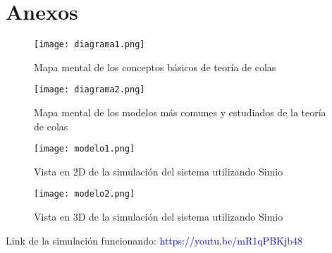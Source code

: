 \documentclass{article}
\begin{document}
\section{Anexos}
\begin{figure}[h]
\begin{center}
	\texttt{[image: diagrama1.png]}
		 \caption{Mapa mental de los conceptos básicos de teoría de colas}
\label{fig5:mapa}
\end{center}
\end{figure}
\begin{figure}[h]
\begin{center}
	\texttt{[image: diagrama2.png]}
		 \caption{Mapa mental de los modelos más comunes y estudiados 
		 de la teoría de colas}
\label{fig6:mapa}
\end{center}
\end{figure}
\begin{figure}[h]
\begin{center}
	\texttt{[image: modelo1.png]}
		 \caption{Vista en 2D de la simulación del sistema utilizando Simio}
\label{fig6:mapa}
\end{center}
\end{figure}
\begin{figure}[h]
\begin{center}
	\texttt{[image: modelo2.png]}
		 \caption{Vista en 3D de la simulación del sistema utilizando Simio}
\label{fig6:mapa}
\end{center}
\end{figure}

Link de la simulación funcionando: \textcolor{blue}{https://youtu.be/mR1qPBKjb48}


\end{document}
